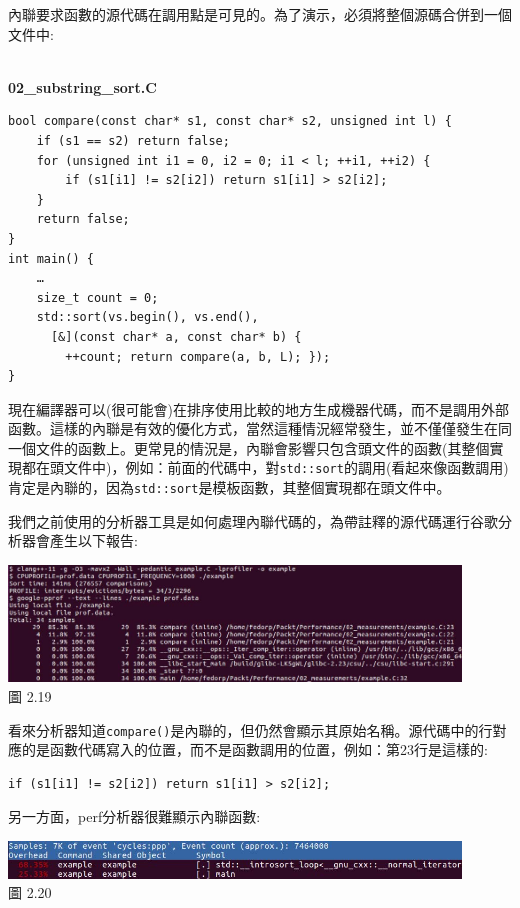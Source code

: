 內聯要求函數的源代碼在調用點是可見的。為了演示，必須將整個源碼合併到一個文件中:

\hspace*{\fill} \\ %
\noindent
\textbf{02\_substring\_sort.C}
\begin{lstlisting}[style=styleCXX]
bool compare(const char* s1, const char* s2, unsigned int l) {
	if (s1 == s2) return false;
	for (unsigned int i1 = 0, i2 = 0; i1 < l; ++i1, ++i2) {
		if (s1[i1] != s2[i2]) return s1[i1] > s2[i2];
	}
	return false;
}
int main() {
	…
	size_t count = 0;
	std::sort(vs.begin(), vs.end(),
	  [&](const char* a, const char* b) {
		++count; return compare(a, b, L); });
}
\end{lstlisting}

現在編譯器可以(很可能會)在排序使用比較的地方生成機器代碼，而不是調用外部函數。這樣的內聯是有效的優化方式，當然這種情況經常發生，並不僅僅發生在同一個文件的函數上。更常見的情況是，內聯會影響只包含頭文件的函數(其整個實現都在頭文件中)，例如：前面的代碼中，對\texttt{std::sort}的調用(看起來像函數調用)肯定是內聯的，因為\texttt{std::sort}是模板函數，其整個實現都在頭文件中。

我們之前使用的分析器工具是如何處理內聯代碼的，為帶註釋的源代碼運行谷歌分析器會產生以下報告:

\begin{center}
\includegraphics[width=0.9\textwidth]{content/1/chapter2/images/19.jpg}\\
圖 2.19
\end{center}

看來分析器知道\texttt{compare()}是內聯的，但仍然會顯示其原始名稱。源代碼中的行對應的是函數代碼寫入的位置，而不是函數調用的位置，例如：第23行是這樣的:

\begin{lstlisting}[style=styleCXX]
if (s1[i1] != s2[i2]) return s1[i1] > s2[i2];
\end{lstlisting}

另一方面，perf分析器很難顯示內聯函數:

\begin{center}
\includegraphics[width=0.9\textwidth]{content/1/chapter2/images/20.jpg}\\
圖 2.20
\end{center}

